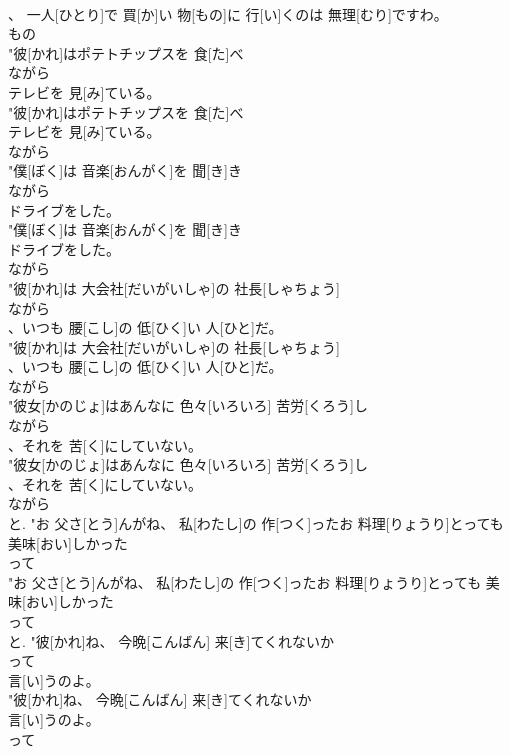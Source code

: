 \documentclass[8pt]{extreport}
\begin{document}
\begin{CJK}{UTF8}{min}
\\	、 一人[ひとり]で 買[か]い 物[もの]に 行[い]くのは 無理[むり]ですわ。
\\	もの
\\	"彼[かれ]はポテトチップスを 食[た]べ
\\	ながら
\\	テレビを 見[み]ている。
\\	"彼[かれ]はポテトチップスを 食[た]べ
\\	テレビを 見[み]ている。
\\	ながら
\\	"僕[ぼく]は 音楽[おんがく]を 聞[き]き
\\	ながら
\\	ドライブをした。
\\	"僕[ぼく]は 音楽[おんがく]を 聞[き]き
\\	ドライブをした。
\\	ながら
\\	"彼[かれ]は 大会社[だいがいしゃ]の 社長[しゃちょう]
\\	ながら
\\	、いつも 腰[こし]の 低[ひく]い 人[ひと]だ。
\\	"彼[かれ]は 大会社[だいがいしゃ]の 社長[しゃちょう]
\\	、いつも 腰[こし]の 低[ひく]い 人[ひと]だ。
\\	ながら
\\	"彼女[かのじょ]はあんなに 色々[いろいろ] 苦労[くろう]し
\\	ながら
\\	、それを 苦[く]にしていない。
\\	"彼女[かのじょ]はあんなに 色々[いろいろ] 苦労[くろう]し
\\	、それを 苦[く]にしていない。
\\	ながら
\\	と.	"お 父さ[とう]んがね、 私[わたし]の 作[つく]ったお 料理[りょうり]とっても 美味[おい]しかった　
\\	って
\\	"お 父さ[とう]んがね、 私[わたし]の 作[つく]ったお 料理[りょうり]とっても 美味[おい]しかった　
\\	って
\\	と.	"彼[かれ]ね、 今晩[こんばん] 来[き]てくれないか
\\	って
\\	言[い]うのよ。
\\	"彼[かれ]ね、 今晩[こんばん] 来[き]てくれないか
\\	言[い]うのよ。
\\	って

\end{CJK}
\end{document}
